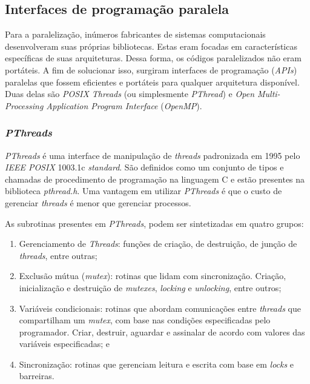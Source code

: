 \documentclass[12pt]{article}
\begin{document}
\subsection{Interfaces de programação paralela}

Para a paralelização, inúmeros fabricantes de sistemas computacionais desenvolveram suas próprias bibliotecas. Estas eram focadas em características específicas de suas arquiteturas. Dessa forma, os códigos paralelizados não eram portáteis. A fim de solucionar isso, surgiram interfaces de programação (\textit{APIs}) paralelas que fossem eficientes e portáteis para qualquer arquitetura disponível. Duas delas são \textit{POSIX Threads} (ou simplesmente \textit{PThread}) e \textit{Open Multi-Processing Application Program Interface} (\textit{OpenMP}).

\subsubsection{\textit{PThreads}} \label{sec:pthreads}

\textit{PThreads} é uma interface de manipulação de \textit{threads} padronizada em 1995 pelo \textit{IEEE POSIX} 1003.1c \textit{standard}. São definidos como um conjunto de tipos e chamadas de procedimento de programação na linguagem C e estão presentes na biblioteca \textit{pthread.h}. Uma vantagem em utilizar \textit{PThreads} é que o custo de gerenciar \textit{threads} é menor que gerenciar processos. 

As subrotinas presentes em \textit{PThreads}, podem ser sintetizadas em quatro grupos: 

\begin{enumerate}
	\item Gerenciamento de \textit{Threads}: funções de criação, de destruição, de junção de \textit{threads}, entre outras;
	\item Exclusão mútua (\textit{mutex}): rotinas que lidam com sincronização. Criação, inicialização e destruição de \textit{mutexes}, \textit{locking} e \textit{unlocking}, entre outros;
	\item Variáveis condicionais: rotinas que abordam comunicações entre \textit{threads} que compartilham um \textit{mutex}, com base nas condições especificadas pelo programador. Criar, destruir, aguardar e assinalar de acordo com valores das variáveis especificadas; e
	\item Sincronização: rotinas que gerenciam leitura e escrita com base em \textit{locks} e barreiras.
\end{enumerate}
\end{document}
